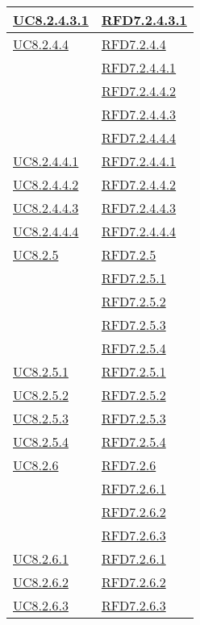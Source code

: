 \begin{longtable}{|>{\centering}m{5cm}|m{5cm}<{\centering}|}
\hyperref[UC8.2.4.3.1]{UC8.2.4.3.1} & \hyperlink{RFD7.2.4.3.1}{RFD7.2.4.3.1}\\ \hline
\hyperref[UC8.2.4.4]{UC8.2.4.4} & \hyperlink{RFD7.2.4.4}{RFD7.2.4.4}\\
& \hyperlink{RFD7.2.4.4.1}{RFD7.2.4.4.1}\\
& \hyperlink{RFD7.2.4.4.2}{RFD7.2.4.4.2}\\
& \hyperlink{RFD7.2.4.4.3}{RFD7.2.4.4.3}\\
& \hyperlink{RFD7.2.4.4.4}{RFD7.2.4.4.4}\\ \hline
\hyperref[UC8.2.4.4.1]{UC8.2.4.4.1} & \hyperlink{RFD7.2.4.4.1}{RFD7.2.4.4.1}\\ \hline
\hyperref[UC8.2.4.4.2]{UC8.2.4.4.2} & \hyperlink{RFD7.2.4.4.2}{RFD7.2.4.4.2}\\ \hline
\hyperref[UC8.2.4.4.3]{UC8.2.4.4.3} & \hyperlink{RFD7.2.4.4.3}{RFD7.2.4.4.3}\\ \hline
\hyperref[UC8.2.4.4.4]{UC8.2.4.4.4} & \hyperlink{RFD7.2.4.4.4}{RFD7.2.4.4.4}\\ \hline
\hyperref[UC8.2.5]{UC8.2.5} & \hyperlink{RFD7.2.5}{RFD7.2.5}\\
& \hyperlink{RFD7.2.5.1}{RFD7.2.5.1}\\
& \hyperlink{RFD7.2.5.2}{RFD7.2.5.2}\\
& \hyperlink{RFD7.2.5.3}{RFD7.2.5.3}\\
& \hyperlink{RFD7.2.5.4}{RFD7.2.5.4}\\ \hline
\hyperref[UC8.2.5.1]{UC8.2.5.1} & \hyperlink{RFD7.2.5.1}{RFD7.2.5.1}\\ \hline
\hyperref[UC8.2.5.2]{UC8.2.5.2} & \hyperlink{RFD7.2.5.2}{RFD7.2.5.2}\\ \hline
\hyperref[UC8.2.5.3]{UC8.2.5.3} & \hyperlink{RFD7.2.5.3}{RFD7.2.5.3}\\ \hline
\hyperref[UC8.2.5.4]{UC8.2.5.4} & \hyperlink{RFD7.2.5.4}{RFD7.2.5.4}\\ \hline
\hyperref[UC8.2.6]{UC8.2.6} & \hyperlink{RFD7.2.6}{RFD7.2.6}\\
& \hyperlink{RFD7.2.6.1}{RFD7.2.6.1}\\
& \hyperlink{RFD7.2.6.2}{RFD7.2.6.2}\\
& \hyperlink{RFD7.2.6.3}{RFD7.2.6.3}\\ \hline
\hyperref[UC8.2.6.1]{UC8.2.6.1} & \hyperlink{RFD7.2.6.1}{RFD7.2.6.1}\\ \hline
\hyperref[UC8.2.6.2]{UC8.2.6.2} & \hyperlink{RFD7.2.6.2}{RFD7.2.6.2}\\ \hline
\hyperref[UC8.2.6.3]{UC8.2.6.3} & \hyperlink{RFD7.2.6.3}{RFD7.2.6.3}\\ \hline

\end{longtable}
